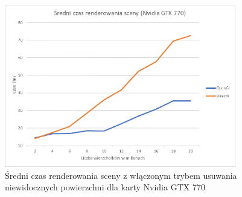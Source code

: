 \documentclass[archive]{mgr}
\begin{document}
\begin{figure}[h!]
  \centering
    \includegraphics[width=0.9\textwidth]{images/cull/1.png}
   \caption{Średni czas renderowania sceny z włączonym trybem usuwania niewidocznych powierzchni dla karty Nvidia GTX 770}
   \label{lab:41}
\end{figure}
\newpage
\end{document}
